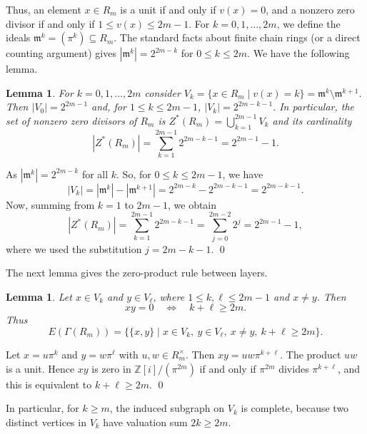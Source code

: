 \documentclass[12pt]{article}
\newtheorem{lemma}[theorem]{Lemma}
\theoremstyle{definition}
\renewenvironment{proof}{{\bf \noindent Proof.}}{\qed}
\begin{document}
Thus, an element $x\in R_m$ is a unit if and only if $v(x)=0$, and a nonzero
zero divisor if and only if $1\le v(x)\le 2m-1$. For $k=0,1,\dots,2m$, we define the ideals $\mathfrak m^k = (\pi^k)\subseteq R_m.$  The standard facts about finite chain rings (or a direct counting argument)
gives $|\mathfrak m^k| = 2^{2m-k}$ for $0\le k\le 2m.$ We have the following lemma.	

\begin{lemma}\label{lem:Vk-gaussian}
	For $k=0,1,\dots,2m$ consider $V_k = \{x\in R_m \mid v(x)=k\}
	= \mathfrak m^k\setminus \mathfrak m^{k+1}.$ 
	Then $|V_0|=2^{2m-1}$ and, for $1\le k\le 2m-1$, $|V_k| = 2^{2m-k-1}.$ In particular, the set of nonzero zero divisors of $R_m$ is $Z^{*}(R_m) = \bigcup_{k=1}^{2m-1} V_k$ and its cardinality
	\[
	|Z^{*}(R_m)| = \sum_{k=1}^{2m-1} 2^{2m-k-1}
	= 2^{2m-1}-1.
	\]
\end{lemma}
\begin{proof}
	As $|\mathfrak m^k|=2^{2m-k}$ for all $k$. So, for $0\le k\le 2m-1$, we have
	\[
	|V_k| = |\mathfrak m^k|-|\mathfrak m^{k+1}|
	= 2^{2m-k}-2^{2m-k-1}
	= 2^{2m-k-1}.
	\]
	Now, summing from $k=1$ to $2m-1$, we obtain
	\[
	|Z^{*}(R_m)|
	= \sum_{k=1}^{2m-1} 2^{2m-k-1}
	= \sum_{j=0}^{2m-2} 2^{j}
	= 2^{2m-1}-1,
	\]
	where we used the substitution $j=2m-k-1$.
\end{proof}

\medskip

The next lemma gives the zero-product rule between layers.

\medskip

\begin{lemma}\label{lem:adjacency-gaussian}
	Let $x\in V_k$ and $y\in V_\ell$, where $1\leq k,\ell\leq 2m-1$ and $x\neq y$.  Then
	$$
	xy=0\quad\Longleftrightarrow\quad k+\ell\geq 2m.
	$$
	Thus
	$$
	E(\Gamma(R_m))=\bigl\{\{x,y\}\mid x\in V_k,\ y\in V_\ell,\ x\neq y,\ k+\ell\geq 2m\bigr\}.
	$$
\end{lemma}

\begin{proof}
	Let $x=u\pi^k$ and $y=w\pi^\ell$ with $u,w\in R_m^\times$.  Then
	$ xy=uw\pi^{k+\ell}. $
	The product $uw$ is a unit.  Hence $xy$ is zero in $\mathbb{Z}[i]/(\pi^{2m})$ if and only if $\pi^{2m}$ divides $\pi^{k+\ell}$, and this is equivalent to $k+\ell\geq 2m$.
\end{proof}

\medskip

In particular, for $k\geq m$, the induced subgraph on $V_k$ is complete, because two distinct vertices in $V_k$ have valuation sum $2k\geq 2m$.
\end{document}

